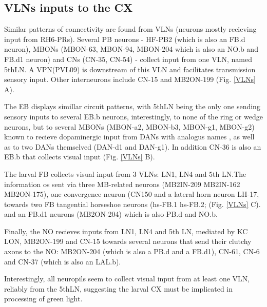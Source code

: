     \subsection{VLNs inputs to the CX}
    Similar patterns of connectivity are found from VLNs (neurons mostly recieving input from RH6-PRs). 
    Several PB neurons -  HF-PB2 (which is also an FB.d neuron), MBONs (MBON-63, MBON-94, MBON-204 which is also an NO.b and FB.d1 neuron) and CNs (CN-35, CN-54) - collect input from one VLN, named 5thLN. A VPN(PVL09) is downstream of this VLN and facilitates transmission sensory input.  Other interneurons include CN-15 and MB2ON-199 (Fig. \ref{VLNs} A).

    The EB displays simillar circuit patterns, with 5thLN being the only one sending sensory inputs to several EB.b neurons, interestingly, to none of the ring or wedge neurons, but to several MBONs (MBON-a2, MBON-b3, MBON-g1, MBON-g2) known to recieve dopaminergic input from DANs with analogus names \citep{eschbach2020recurrent}, as well as to two DANs themselved (DAN-d1 and DAN-g1). In addition CN-36 is also an EB.b that collects visual input (Fig. \ref{VLNs} B).

    The larval FB collects visual input from 3 VLNs: LN1, LN4 and 5th LN.The information os sent via three MB-related neurons (MB2IN-209 MB2IN-162 MB2ON-175), one convergence neuron (CN150 and a lateral horn neuron LH-17, towards two FB tangential horseshoe neurons (hs-FB.1 hs-FB.2; (Fig. \ref{VLNs} C). and an FB.d1 neurons (MB2ON-204) which is also PB.d and NO.b.

    Finally, the NO recieves inputs from LN1, LN4 and 5th LN, mediated by KC LON, MB2ON-199 and CN-15 towards several neurons that send their clutchy axons to the NO:  MB2ON-204 (which is also a PB.d and a FB.d1), CN-61, CN-6 and CN-37 (which is also an LAL.b). 

    Interestingly, all neuropils seem to collect visual input from at least one VLN, reliably from the 5thLN, suggesting the larval CX must be implicated in processing of green light. 


